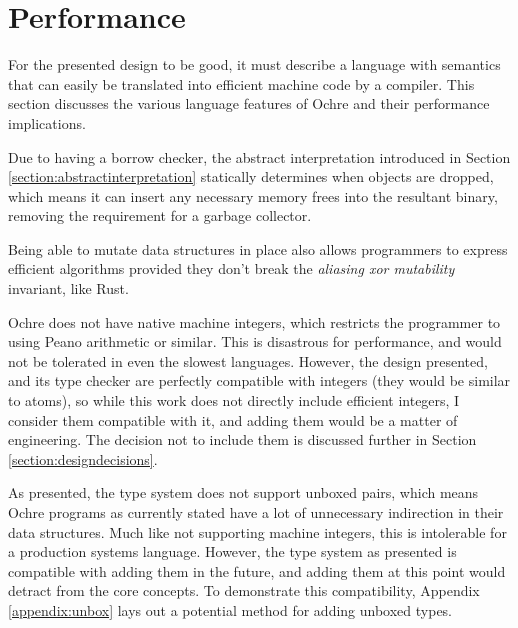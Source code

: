 \documentclass[12pt,twoside]{report}
\begin{document}
  
\section{Performance}
\label{section:performance}
For the presented design to be good, it must describe a language with semantics that can easily be translated into efficient machine code by a compiler. This section discusses the various language features of Ochre and their performance implications.

Due to having a borrow checker, the abstract interpretation introduced in Section \ref{section:abstractinterpretation} statically determines when objects are dropped, which means it can insert any necessary memory frees into the resultant binary, removing the requirement for a garbage collector.

Being able to mutate data structures in place also allows programmers to express efficient algorithms provided they don't break the \textit{aliasing xor mutability} invariant, like Rust.

Ochre does not have native machine integers, which restricts the programmer to using Peano arithmetic or similar. This is disastrous for performance, and would not be tolerated in even the slowest languages. However, the design presented, and its type checker are perfectly compatible with integers (they would be similar to atoms), so while this work does not directly include efficient integers, I consider them compatible with it, and adding them would be a matter of engineering. The decision not to include them is discussed further in Section \ref{section:designdecisions}.

As presented, the type system does not support unboxed pairs, which means Ochre programs as currently stated have a lot of unnecessary indirection in their data structures. Much like not supporting machine integers, this is intolerable for a production systems language. However, the type system as presented is compatible with adding them in the future, and adding them at this point would detract from the core concepts. To demonstrate this compatibility, Appendix \ref{appendix:unbox} lays out a potential method for adding unboxed types.
\end{document}
